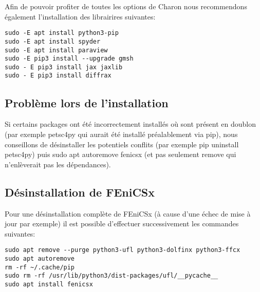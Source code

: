 \documentclass[10pt]{book}
\begin{document}
Afin de pouvoir profiter de toutes les options de Charon nous recommendons également l'installation des librairires suivantes:
\begin{verbatim}
sudo -E apt install python3-pip
sudo -E apt install spyder
sudo -E apt install paraview
sudo -E pip3 install --upgrade gmsh
sudo - E pip3 install jax jaxlib
sudo - E pip3 install diffrax
\end{verbatim}
\subsection{Problème lors de l'installation}
Si certains packages ont été incorrectement installés où sont présent en doublon (par exemple petsc4py qui aurait été installé préalablement via pip), nous conseillons de désinstaller les potentiels conflits (par exemple pip uninstall petsc4py) puis sudo apt autoremove fenicsx (et pas seulement remove qui n'enlèverait pas les dépendances).
\subsection{Désinstallation de FEniCSx}
Pour une désinstallation complète de FEniCSx (à cause d'une échec de mise à jour par exemple) il est possible d'effectuer successivement les commandes suivantes:
\begin{verbatim}
sudo apt remove --purge python3-ufl python3-dolfinx python3-ffcx
sudo apt autoremove
rm -rf ~/.cache/pip
sudo rm -rf /usr/lib/python3/dist-packages/ufl/__pycache__
sudo apt install fenicsx
\end{verbatim}
\end{document}
